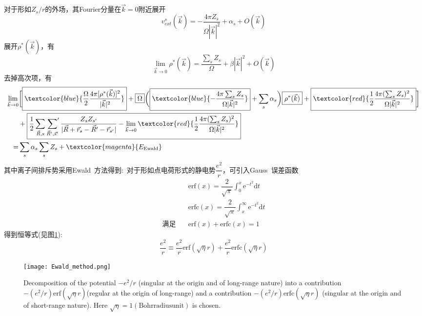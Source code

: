 对于形如$Z_s/r$的外场，其\textrm{Fourier}分量在$\vec k=0$附近展开
	\begin{equation}
		v_{ext}^s(\vec k)=-\dfrac{4\pi Z_s}{\Omega|\vec k|^2}+\alpha_s+O(\vec k)
		\label{eq:V_ext}
	\end{equation}
展开$\rho^{\ast}(\vec k)$，有
	\begin{equation}
		\lim_{\vec k\rightarrow 0}\rho^{\ast}(\vec k)=\dfrac{\sum_sZ_s}{\Omega}+\beta|\vec k|^2+O(\vec k)
		\label{eq:rho_ext}
	\end{equation}
去掉高次项，有
\begin{equation}
	\begin{aligned}
		\lim_{\vec k\rightarrow 0}&\bigg[\boxed{\textcolor{blue}{\dfrac{\Omega}2\dfrac{4\pi[\rho^{\ast}(\vec k)]^2}{|\vec k|^2}}}+\boxed{\Omega}\bigg(\boxed{\textcolor{blue}{-\dfrac{4\pi\sum_sZ_s}{\Omega|\vec k|^2}}}+\sum_s\alpha_s\bigg)\boxed{\rho^{\ast}(\vec k)}+\boxed{\textcolor{red}{\dfrac12\dfrac{4\pi(\sum_sZ_s)^2}{\Omega|\vec k|^2}}}\bigg]\\
		&+\boxed{\dfrac12\sum_{\vec R,s}\sideset{}{^{\prime}}\sum_{\vec R^{\prime},\vec s^{\prime}}\dfrac{Z_sZ_{s^{\prime}}}{|\vec R+\vec r_s-\vec R^{\prime}-\vec r_{s^{\prime}}|}-\lim_{\vec k\rightarrow0}\textcolor{red}{\dfrac12\dfrac{4\pi(\sum_sZ_s)^2}{\Omega|\vec k|^2}}}\\
		=&\sum_s\alpha_s\sum_sZ_s+\textcolor{magenta}{E_{\mathrm{Ewald}}}
	\end{aligned}
	\label{eq:V_ext_exp2}
\end{equation}
其中离子间排斥势采用\textrm{Ewald~}方法得到:~对于形如点电荷形式的静电势$\dfrac{e^2}r$，可引入\textrm{Gauss~}误差函数
\begin{equation}
	\begin{aligned}
		&\mathrm{erf}(x)=\dfrac2{\sqrt{\pi}}\int_0^{x}\mathrm{e}^{-t^2}\mathrm{d}t\\
		&\mathrm{erfc}(x)=\dfrac2{\sqrt{\pi}}\int_x^{\infty}\mathrm{e}^{-t^2}\mathrm{d}t\\
		\mbox{满足}\quad&\mathrm{erf}(x)+\mathrm{erfc}(x)=1
	\end{aligned}
	\label{eq:err_fun}
\end{equation}
得到恒等式(见图\ref{Error_Function}):
\begin{equation}
	\dfrac{e^2}r\equiv\dfrac{e^2}r\mathrm{erf}(\sqrt{\eta}r)+\dfrac{e^2}r\mathrm{erfc}(\sqrt{\eta}r)
	\label{eq:err_fun_comp}
\end{equation}
\begin{figure}[h!]
\centering
\vspace*{-0.10in}
\texttt{[image: Ewald\_method.png]}
\caption{\small \textrm{Decomposition of the potential $-e^2/r$ (singular at the origin and of long-range nature) into a contribution $-(e^2/r)\mathrm{erf}(\sqrt{\eta}r)$(regular at the origin of long-range) and a contribution $-(e^2/r)\mathrm{erfc}(\sqrt{\eta}r)$ (singular at the origin and of short-range nature). Here $\sqrt{\eta}=1 (\mathrm{Bohr radius unit})$ is chosen.}}%
\label{Error_Function}
\end{figure}

